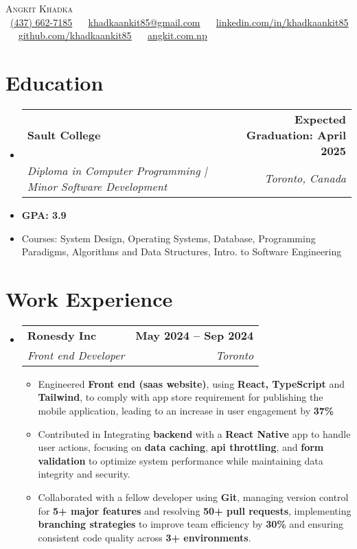 \documentclass[letterpaper,11pt]{article}
\makeatletter
\newcommand{\resumeItem}[1]{
  \item\small{
    {#1 \vspace{0pt}}
  }
}
\newcommand{\resumeSubheading}[4]{
  \vspace{-2pt}\item
    \begin{tabular*}{1.0\textwidth}[t]{l@{\extracolsep{\fill}}r}
      \textbf{#1} & \textbf{\small #2} \\
      \textit{\small#3} & \textit{\small #4} \\
    \end{tabular*}\vspace{-7pt}
}
\newcommand{\resumeItem}[1]{
  \item\small{
    {#1 \vspace{0pt}}
  }
}
\newcommand{\resumeSubheading}[4]{
  \vspace{-2pt}\item
    \begin{tabular*}{1.0\textwidth}[t]{l@{\extracolsep{\fill}}r}
      \textbf{#1} & \textbf{\small #2} \\
      \textit{\small#3} & \textit{\small #4} \\
    \end{tabular*}\vspace{-7pt}
}
\newcommand{\resumeSubHeadingListStart}{\begin{itemize}[leftmargin=0.0in, label={}]}
\newcommand{\resumeSubHeadingListEnd}{\end{itemize}}\vspace{0pt}
\newcommand{\resumeItemListStart}{\begin{itemize}}
\newcommand{\resumeItemListEnd}{\end{itemize}\vspace{-5pt}}
\makeatother
\begin{document}
\begin{center}
    {\Large \scshape Angkit Khadka} \\[2mm]
    \footnotesize \raisebox{-0.1\height}
    \faPhone\ \underline{(437) 662-7185} ~ 
    {\faEnvelope\  \underline{khadkaankit85@gmail.com}} ~ 
    {\faLinkedin\ \underline{\href{https://www.linkedin.com/in/khadkaankit85/}{linkedin.com/in/khadkaankit85}}} ~
    {\faGithub\ \underline{\href{https://github.com/khadkaankit85}{github.com/khadkaankit85}}} ~
    {\faBriefcase\ \underline{\href{https://angkit.com.np/}{angkit.com.np}}}
    \vspace{-8pt}
\end{center}


\section{Education} 
  \resumeSubHeadingListStart
    \resumeSubheading
      {Sault College}{Expected Graduation: April 2025}
      {Diploma in Computer Programming | Minor Software Development
      }{Toronto, Canada}
  \resumeSubHeadingListEnd
    \resumeItemListStart
        \resumeItem { \textbf{GPA: 3.9}}
        \vspace{-7pt}
        \resumeItem {Courses: System Design, Operating Systems, Database, Programming Paradigms, Algorithms and Data Structures, Intro. to Software Engineering}
    \resumeItemListEnd
    \vspace{-12pt}
\section{Work Experience}
    \resumeSubHeadingListStart
                \resumeSubheading{Ronesdy Inc}{May 2024 -- Sep 2024}{Front end Developer}{Toronto} 
                \resumeItemListStart
                    \resumeItem{Engineered \textbf{Front end (saas website)}, using \textbf{React, TypeScript} and \textbf{Tailwind}, to comply with app store requirement  for publishing the mobile application, leading to an increase in user engagement  by \textbf{37\%}}
                    \resumeItem{Contributed in Integrating \textbf{backend} with a \textbf{React Native} app to handle user actions, focusing on \textbf{data caching}, \textbf{api throttling}, and \textbf{form validation} to optimize system performance while maintaining data integrity and security.}
                    \resumeItem{Collaborated with a fellow developer using \textbf{Git}, managing version control for \textbf{5+ major features} and resolving \textbf{50+ pull requests}, implementing \textbf{branching strategies} to improve team efficiency by \textbf{30\%} and ensuring consistent code quality across \textbf{3+ environments}.}
                    \resumeItemListEnd
    \resumeSubHeadingListEnd
    \vspace{-12pt}
\end{document}
